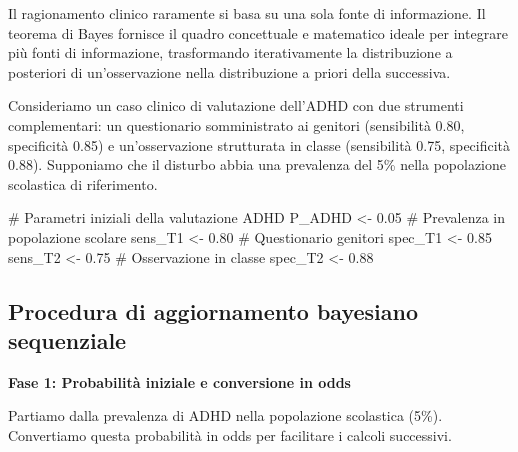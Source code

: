 \documentclass[
  letterpaper,
  DIV=11,
  numbers=noendperiod,
  oneside]{scrreprt}
\newenvironment{Shaded}{\begin{snugshade}}{\end{snugshade}}
\newcommand{\CommentTok}[1]{\textcolor[rgb]{0.37,0.37,0.37}{#1}}
\newcommand{\FloatTok}[1]{\textcolor[rgb]{0.68,0.00,0.00}{#1}}
\newcommand{\NormalTok}[1]{\textcolor[rgb]{0.00,0.23,0.31}{#1}}
\newcommand{\OtherTok}[1]{\textcolor[rgb]{0.00,0.23,0.31}{#1}}
\theoremstyle{definition}
\theoremstyle{plain}
\theoremstyle{definition}
\theoremstyle{remark}
\begin{document}
\begin{tcolorbox}[enhanced jigsaw, arc=.35mm, breakable, colbacktitle=quarto-callout-note-color!10!white, opacityback=0, toprule=.15mm, rightrule=.15mm, colback=white, opacitybacktitle=0.6, leftrule=.75mm, coltitle=black, bottomtitle=1mm, left=2mm, toptitle=1mm, title=\textcolor{quarto-callout-note-color}{\faInfo}\hspace{0.5em}{Diagnostica sequenziale: l'accumulo di evidenze}, titlerule=0mm, bottomrule=.15mm, colframe=quarto-callout-note-color-frame]

Il ragionamento clinico raramente si basa su una sola fonte di
informazione. Il teorema di Bayes fornisce il quadro concettuale e
matematico ideale per integrare più fonti di informazione, trasformando
iterativamente la distribuzione a posteriori di un'osservazione nella
distribuzione a priori della successiva.

Consideriamo un caso clinico di valutazione dell'ADHD con due strumenti
complementari: un questionario somministrato ai genitori (sensibilità
0.80, specificità 0.85) e un'osservazione strutturata in classe
(sensibilità 0.75, specificità 0.88). Supponiamo che il disturbo abbia
una prevalenza del 5\% nella popolazione scolastica di riferimento.

\begin{Shaded}
\begin{Highlighting}[]
\CommentTok{\# Parametri iniziali della valutazione ADHD}
\NormalTok{P\_ADHD }\OtherTok{\textless{}{-}} \FloatTok{0.05}       \CommentTok{\# Prevalenza in popolazione scolare}
\NormalTok{sens\_T1 }\OtherTok{\textless{}{-}} \FloatTok{0.80}      \CommentTok{\# Questionario genitori}
\NormalTok{spec\_T1 }\OtherTok{\textless{}{-}} \FloatTok{0.85}
\NormalTok{sens\_T2 }\OtherTok{\textless{}{-}} \FloatTok{0.75}      \CommentTok{\# Osservazione in classe  }
\NormalTok{spec\_T2 }\OtherTok{\textless{}{-}} \FloatTok{0.88}
\end{Highlighting}
\end{Shaded}

\subsection*{Procedura di aggiornamento bayesiano
sequenziale}\label{procedura-di-aggiornamento-bayesiano-sequenziale}

\textbf{Fase 1: Probabilità iniziale e conversione in odds}

Partiamo dalla prevalenza di ADHD nella popolazione scolastica (5\%).
Convertiamo questa probabilità in odds per facilitare i calcoli
successivi.


\end{tcolorbox}
\end{document}
